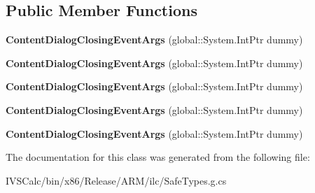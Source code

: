 \subsection*{Public Member Functions}
\begin{DoxyCompactItemize}
\item 
\mbox{\label{class_windows_1_1_u_i_1_1_xaml_1_1_controls_1_1_content_dialog_closing_event_args_a086f7179f27354dd13730d8d49dbd4d4}} 
{\bfseries Content\+Dialog\+Closing\+Event\+Args} (global\+::\+System.\+Int\+Ptr dummy)
\item 
\mbox{\label{class_windows_1_1_u_i_1_1_xaml_1_1_controls_1_1_content_dialog_closing_event_args_a086f7179f27354dd13730d8d49dbd4d4}} 
{\bfseries Content\+Dialog\+Closing\+Event\+Args} (global\+::\+System.\+Int\+Ptr dummy)
\item 
\mbox{\label{class_windows_1_1_u_i_1_1_xaml_1_1_controls_1_1_content_dialog_closing_event_args_a086f7179f27354dd13730d8d49dbd4d4}} 
{\bfseries Content\+Dialog\+Closing\+Event\+Args} (global\+::\+System.\+Int\+Ptr dummy)
\item 
\mbox{\label{class_windows_1_1_u_i_1_1_xaml_1_1_controls_1_1_content_dialog_closing_event_args_a086f7179f27354dd13730d8d49dbd4d4}} 
{\bfseries Content\+Dialog\+Closing\+Event\+Args} (global\+::\+System.\+Int\+Ptr dummy)
\item 
\mbox{\label{class_windows_1_1_u_i_1_1_xaml_1_1_controls_1_1_content_dialog_closing_event_args_a086f7179f27354dd13730d8d49dbd4d4}} 
{\bfseries Content\+Dialog\+Closing\+Event\+Args} (global\+::\+System.\+Int\+Ptr dummy)
\end{DoxyCompactItemize}


The documentation for this class was generated from the following file\+:\begin{DoxyCompactItemize}
\item 
I\+V\+S\+Calc/bin/x86/\+Release/\+A\+R\+M/ilc/Safe\+Types.\+g.\+cs\end{DoxyCompactItemize}
